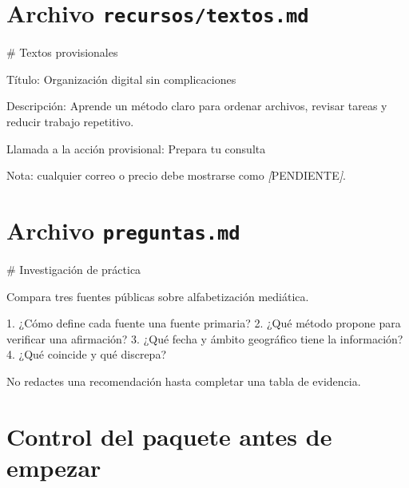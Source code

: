 \documentclass[10pt,a4paper,openany]{book}
\newenvironment{Shaded}{}{}
\newcommand{\CommentTok}[1]{\textcolor[rgb]{0.38,0.63,0.69}{\textit{#1}}}
\newcommand{\FunctionTok}[1]{\textcolor[rgb]{0.02,0.16,0.49}{#1}}
\newcommand{\NormalTok}[1]{#1}
\newcommand{\OtherTok}[1]{\textcolor[rgb]{0.00,0.44,0.13}{#1}}
\newcommand{\SpecialStringTok}[1]{\textcolor[rgb]{0.73,0.40,0.53}{#1}}
\renewenvironment{Shaded}
  {\begin{tcolorbox}[
    enhanced,
    breakable,
    colback=CodeBg,
    colframe=Border,
    boxrule=0.5pt,
    arc=2mm,
    left=3mm,
    right=3mm,
    top=2.2mm,
    bottom=2.2mm,
    before skip=0.8em,
    after skip=0.9em
  ]}
  {\end{tcolorbox}}
\begin{document}
\section{\texorpdfstring{Archivo
\texttt{recursos/textos.md}}{Archivo recursos/textos.md}}\label{archivo-recursostextos.md}

\begin{Shaded}
\begin{Highlighting}[]
\FunctionTok{\# Textos provisionales}

\NormalTok{Título: Organización digital sin complicaciones}

\NormalTok{Descripción: Aprende un método claro para ordenar archivos, revisar tareas}
\NormalTok{y reducir trabajo repetitivo.}

\NormalTok{Llamada a la acción provisional: Prepara tu consulta}

\NormalTok{Nota: cualquier correo o precio debe mostrarse como }\CommentTok{[}\OtherTok{PENDIENTE}\CommentTok{]}\NormalTok{.}
\end{Highlighting}
\end{Shaded}

\section{\texorpdfstring{Archivo
\texttt{preguntas.md}}{Archivo preguntas.md}}\label{archivo-preguntas.md}

\begin{Shaded}
\begin{Highlighting}[]
\FunctionTok{\# Investigación de práctica}

\NormalTok{Compara tres fuentes públicas sobre alfabetización mediática.}

\SpecialStringTok{1. }\NormalTok{¿Cómo define cada fuente una fuente primaria?}
\SpecialStringTok{2. }\NormalTok{¿Qué método propone para verificar una afirmación?}
\SpecialStringTok{3. }\NormalTok{¿Qué fecha y ámbito geográfico tiene la información?}
\SpecialStringTok{4. }\NormalTok{¿Qué coincide y qué discrepa?}

\NormalTok{No redactes una recomendación hasta completar una tabla de evidencia.}
\end{Highlighting}
\end{Shaded}

\section{Control del paquete antes de
empezar}\label{control-del-paquete-antes-de-empezar}
\end{document}
